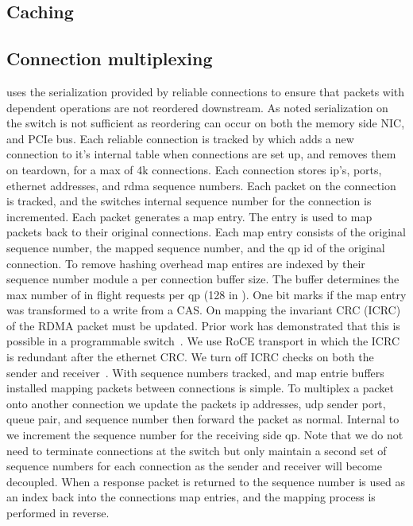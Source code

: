 \subsection{Caching}

\subsection{Connection multiplexing}

\sword uses the serialization provided by reliable
connections to ensure that packets with dependent operations
are not reordered downstream. As noted serialization on the
switch is not sufficient as reordering can occur on both the
memory side NIC, and PCIe bus. Each reliable connection is
tracked by \sword which adds a new connection to it's
internal table when connections are set up, and removes them
on teardown, for a max of 4k connections. Each connection
stores ip's, ports, ethernet addresses, and rdma sequence
numbers. Each packet on the connection is tracked, and the
switches internal sequence number for the connection is
incremented.
Each packet generates a map entry. The entry is used to map
packets back to their original connections. Each map entry
consists of the original sequence number, the mapped
sequence number, and the qp id of the original connection.
To remove hashing overhead map entires are indexed by their
sequence number module a per connection buffer size. The
buffer determines the max number of in flight requests per
qp (128 in \sword). One bit marks if the map entry was
transformed to a write from a CAS.
On mapping the invariant CRC (ICRC) of the RDMA packet must
be updated. Prior work has demonstrated that this is
possible in a programmable switch~. We use RoCE
transport in which the ICRC is redundant after the ethernet
CRC. We turn off ICRC checks on both the sender and
receiver~\cite{switchml}.
With sequence numbers tracked, and map entrie buffers
installed mapping packets between connections is simple. To
multiplex a packet onto another connection we update the
packets ip addresses, udp sender port, queue pair, and
sequence number then forward the packet as normal. Internal
to {\sword} we increment the sequence number for the
receiving side qp. Note that we do not need to terminate
connections at the switch but only maintain a second set of
sequence numbers for each connection as the sender and
receiver will become decoupled. When a response packet is
returned to {\sword} the sequence number is used as an index
back into the connections map entries, and the mapping
process is performed in reverse.

